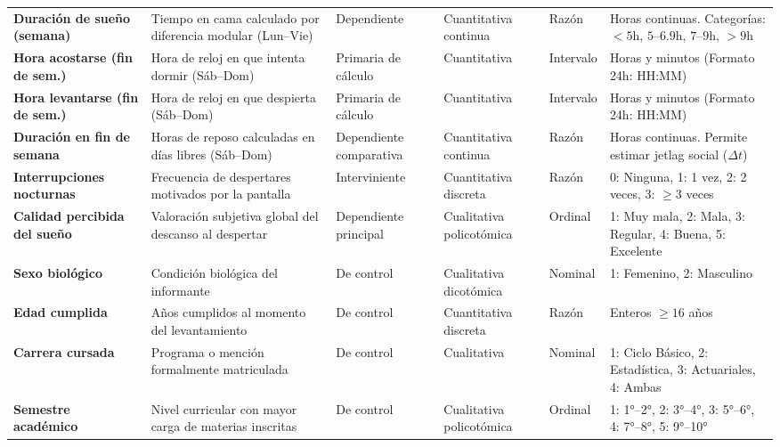 \documentclass[12pt, letterpaper]{article}
\begin{document}
\begin{table}[H]
\begin{tabularx}{\textwidth}{p{3.2cm}p{3.8cm}lllX}
        \addlinespace
        \textbf{Duración de sueño (semana)} & Tiempo en cama calculado por diferencia modular (Lun--Vie) & Dependiente & Cuantitativa continua & Razón & Horas continuas. Categorías: $<5$h, $5\text{--}6.9$h, $7\text{--}9$h, $>9$h \\
        \addlinespace
        \textbf{Hora acostarse (fin de sem.)} & Hora de reloj en que intenta dormir (Sáb--Dom) & Primaria de cálculo & Cuantitativa & Intervalo & Horas y minutos (Formato 24h: HH:MM) \\
        \addlinespace
        \textbf{Hora levantarse (fin de sem.)} & Hora de reloj en que despierta (Sáb--Dom) & Primaria de cálculo & Cuantitativa & Intervalo & Horas y minutos (Formato 24h: HH:MM) \\
        \addlinespace
        \textbf{Duración en fin de semana} & Horas de reposo calculadas en días libres (Sáb--Dom) & Dependiente comparativa & Cuantitativa continua & Razón & Horas continuas. Permite estimar jetlag social ($\Delta t$) \\
        \addlinespace
        \textbf{Interrupciones nocturnas} & Frecuencia de despertares motivados por la pantalla & Interviniente & Cuantitativa discreta & Razón & 0: Ninguna, 1: 1 vez, 2: 2 veces, 3: $\ge 3$ veces \\
        \addlinespace
        \textbf{Calidad percibida del sueño} & Valoración subjetiva global del descanso al despertar & Dependiente principal & Cualitativa policotómica & Ordinal & 1: Muy mala, 2: Mala, 3: Regular, 4: Buena, 5: Excelente \\
        \addlinespace
        \textbf{Sexo biológico} & Condición biológica del informante & De control & Cualitativa dicotómica & Nominal & 1: Femenino, 2: Masculino \\
        \addlinespace
        \textbf{Edad cumplida} & Años cumplidos al momento del levantamiento & De control & Cuantitativa discreta & Razón & Enteros $\ge 16$ años \\
        \addlinespace
        \textbf{Carrera cursada} & Programa o mención formalmente matriculada & De control & Cualitativa & Nominal & 1: Ciclo Básico, 2: Estadística, 3: Actuariales, 4: Ambas \\
        \addlinespace
        \textbf{Semestre académico} & Nivel curricular con mayor carga de materias inscritas & De control & Cualitativa policotómica & Ordinal & 1: 1°--2°, 2: 3°--4°, 3: 5°--6°, 4: 7°--8°, 5: 9°--10° \\
        \bottomrule
    \end{tabularx}
\end{table}
\end{document}
